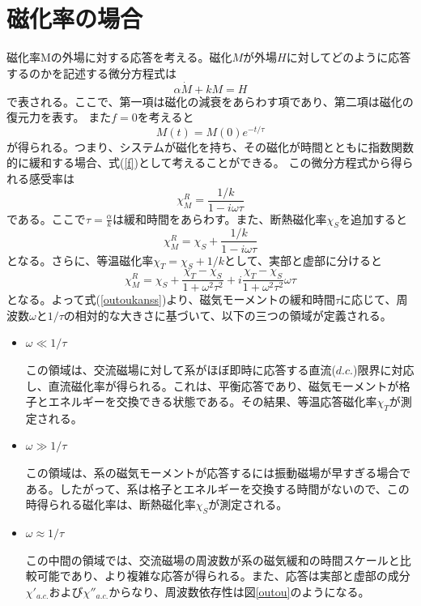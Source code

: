 \documentclass[11pt,a4j]{jreport}
\begin{document}
\section{磁化率の場合}
磁化率Mの外場に対する応答を考える。磁化$M$が外場$H$に対してどのように応答するのかを記述する微分方程式は
\begin{equation}
 \alpha\dot{M}+kM=H
 \label{f}
\end{equation}
で表される。ここで、第一項は磁化の減衰をあらわす項であり、第二項は磁化の復元力を表す。
また$f=0$を考えると
\begin{equation}
  M(t)=M(0)e^{-t/\tau}
\end{equation}
が得られる。つまり、システムが磁化を持ち、その磁化が時間とともに指数関数的に緩和する場合、式(\ref{f})として考えることができる。
この微分方程式から得られる感受率は
\begin{equation}
  \chi_M^R = \frac{1/k}{1-i\omega\tau}
\end{equation}
である。ここで$\tau= \frac{\alpha}{k}$は緩和時間をあらわす。また、断熱磁化率$\chi_S$を追加すると
\begin{equation}
  \chi_M^R = \chi_S+\frac{1/k}{1-i\omega\tau}　
\end{equation}
となる。さらに、等温磁化率$\chi_T=\chi_S+1/k$として、実部と虚部に分けると
\begin{equation}
  \chi_M^R=\chi_S+\frac{\chi_T-\chi_S}{1+\omega^2\tau^2}+i\frac{\chi_T-\chi_S}{1+\omega^2\tau^2}\omega\tau
  \label{outoukanss}
\end{equation}
となる。よって式(\ref{outoukanss})より、磁気モーメントの緩和時間$\tau$に応じて、周波数$\omega$と$1/\tau$の相対的な大きさに基づいて、以下の三つの領域が定義される。
\begin{itemize}
  \item $\omega\ll 1/\tau$\par
  この領域は、交流磁場に対して系がほぼ即時に応答する直流($d.c.$)限界に対応し、直流磁化率が得られる。これは、平衡応答であり、磁気モーメントが格子とエネルギーを交換できる状態である。その結果、等温応答磁化率$\chi_T$が測定される。
  \item $\omega\gg 1/\tau$\par
  この領域は、系の磁気モーメントが応答するには振動磁場が早すぎる場合である。したがって、系は格子とエネルギーを交換する時間がないので、この時得られる磁化率は、断熱磁化率$\chi_S$が測定される。
  \item $\omega\approx 1/\tau$\par
  この中間の領域では、交流磁場の周波数が系の磁気緩和の時間スケールと比較可能であり、より複雑な応答が得られる。また、応答は実部と虚部の成分$\chi'_{a.c.}$および$\chi''_{a.c.}$からなり、周波数依存性は図\ref{outou}のようになる。
\end{itemize}
\end{document}
